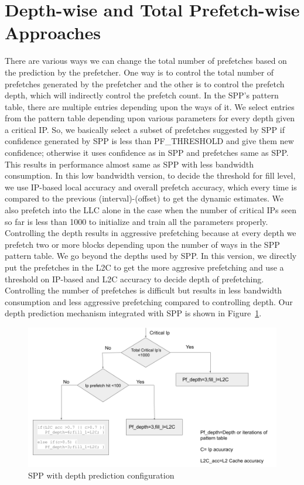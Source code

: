 \section{Depth-wise and Total Prefetch-wise Approaches}

There are various ways we can change the total number of prefetches based on the prediction by the prefetcher.
One way is to control the total number of prefetches generated by the prefetcher and the other is to control the prefetch depth, which will indirectly control the prefetch count. In the SPP's pattern table, there are multiple entries depending upon the ways of it. We select entries from the pattern table depending upon various parameters for every depth given a critical IP. So, we basically select a subset of prefetches suggested by SPP if confidence generated by SPP is less than PF\_THRESHOLD and give them new confidence; otherwise it uses confidence as in SPP and prefetches same as SPP.
This results in performance almost same as SPP with less bandwidth consumption. In this low bandwidth version, to decide the threshold for fill level, we use IP-based local accuracy and overall prefetch accuracy, which every time is compared to the previous (interval)-(offset) to get the dynamic estimates.
We also prefetch into the LLC alone in the case when the number of critical IPs seen so far is less than 1000 to initialize and train all the parameters properly. Controlling the depth results in aggressive prefetching because at every depth we prefetch two or more blocks depending upon the number of ways in the SPP pattern table. We go beyond the depths used by SPP. In this version, we directly put the prefetches in the L2C to get the more aggresive prefetching and use a threshold on IP-based and L2C accuracy to decide depth of prefetching. Controlling the number of prefetches is difficult but results in less bandwidth consumption and less aggressive prefetching compared to controlling depth. Our depth prediction mechanism integrated with SPP is shown in Figure~\ref{fig:sppdepth}.
\begin{figure}[H]
\includegraphics[scale=0.4]{images/Depth.png}
\caption{SPP with depth prediction configuration}
\label{fig:sppdepth}
\end{figure}

